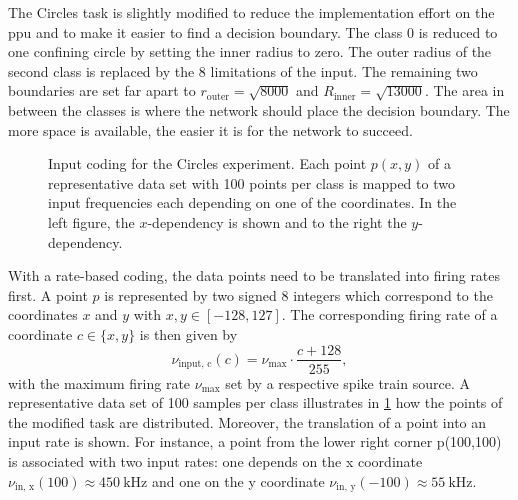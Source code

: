 The Circles task is slightly modified to reduce the implementation effort on the \gls{ppu} and to make it easier to find a decision boundary. The class $0$ is reduced to one confining circle by setting the inner radius to zero. The outer radius of the second class is replaced by the \SI{8}{\bit} limitations of the input. The remaining two boundaries are set far apart to $r_{\text{outer}} = \sqrt{8000}$ and $R_{\text{inner}} = \sqrt{13000}$. The area in between the classes is where the network should place the decision boundary. The more space is available, the easier it is for the network to succeed. 

\begin{figure}[b!]
	\begin{subfigure}[c]{0.5\textwidth}
		\centering
	\end{subfigure}
	\begin{subfigure}[c]{0.5\textwidth}
		\centering
	\end{subfigure}
	\caption[Input coding for the Circles experiment.]{Input coding for the Circles experiment. Each point $p(x,y)$ of a representative data set with 100 points per class is mapped to two input frequencies each depending on one of the coordinates. In the left figure, the $x$-dependency is shown and to the right the $y$-dependency.}
	\label{circlesinputs}
\end{figure}

With a rate-based coding, the data points need to be translated into firing rates first. A point $p$ is represented by two signed \SI{8}{\bit} integers which correspond to the coordinates $x$ and $y$ with $x, y \in [-128,127]$. The corresponding firing rate of a coordinate $c \in \{x,y\}$ is then given by
\begin{equation}\label{inputfrequency}
\nu_{\text{input, c}}(c) = \nu_\text{max} \cdot \frac{c + 128}{255},
\end{equation}
with the maximum firing rate $\nu_\text{max}$ set by a respective spike train source. A representative data set of 100 samples per class illustrates in \cref{circlesinputs} how the points of the modified task are distributed. Moreover, the translation of a point into an input rate is shown. For instance, a point from the lower right corner p(100,100) is associated with two input rates: one depends on the x coordinate $\nu_{\text{in, x}}(100) \approx \SI{450}{\kilo \Hz}$ and one on the y coordinate $\nu_{\text{in, y}}(-100) \approx \SI{55}{\kilo \Hz}$.

